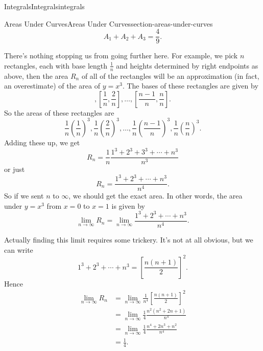 \documentclass[oneside,10pt,]{book}
\numberwithin{equation}{section}
\begin{document}
\begin{chapterptx}{Integrals}{}{Integrals}{}{}{integrals}
\begin{sectionptx}{Areas Under Curves}{}{Areas Under Curves}{}{}{section-areas-under-curves}
\begin{equation*}
A_{1} + A_{2} + A_{3} = \frac{4}{9}.
\end{equation*}
%
\par
\hypertarget{p-405}{}%
There's nothing stopping us from going further here. For example, we pick \(n\) rectangles, each with base length \(\frac{1}{n}\) and heights determined by right endpoints as above, then the area \(R_{n}\) of all of the rectangles will be an approximation (in fact, an overestimate) of the area of \(y = x^{3}\). The bases of these rectangles are given by%
\begin{equation*}
[0,\frac{1}{n}], [\frac{1}{n},\frac{2}{n}],\ldots,[\frac{n-1}{n},\frac{n}{n}].
\end{equation*}
So the areas of these rectangles are%
\begin{equation*}
\frac{1}{n}\left(\frac{1}{n}\right)^{3}, \frac{1}{n}\left(\frac{2}{n}\right)^{3},\ldots,\frac{1}{n}\left(\frac{n-1}{n}\right)^{3}, \frac{1}{n}\left(\frac{n}{n}\right)^{3}.
\end{equation*}
Adding these up, we get%
\begin{equation*}
R_{n} = \frac{1}{n}\frac{1^{3}+2^{3} + 3^{3} + \cdots + n^{3}}{n^{3}}
\end{equation*}
or just%
\begin{equation*}
R_{n} = \frac{1^{3} + 2^{3} + \cdots + n^{3}}{n^{4}}.
\end{equation*}
So if we sent \(n\) to \(\infty\), we should get the exact area. In other words, the area under \(y=x^{3}\) from \(x=0\) to \(x=1\) is given by%
\begin{equation*}
\lim_{n\to\infty}R_{n} = \lim_{n\to\infty}\frac{1^{3} + 2^{3} + \cdots + n^{3}}{n^{4}}.
\end{equation*}
%
\par
\hypertarget{p-406}{}%
Actually finding this limit requires some trickery. It's not at all obvious, but we can write%
\begin{equation*}
1^{3} + 2^{3} + \cdots + n^{3} = \left[\frac{n(n+1)}{2}\right]^{2}.
\end{equation*}
Hence%
\begin{align*}
\lim_{n\to\infty}R_{n} & = \lim_{n\to\infty}\frac{1}{n^{4}}\left[\frac{n(n+1)}{2}\right]^{2} \\
& = \lim_{n\to\infty}\frac{1}{4}\frac{n^{2}(n^{2}+2n+1)}{n^{4}} \\
& = \lim_{n\to\infty}\frac{1}{4}\frac{n^{4} + 2n^{3} + n^{2}}{n^{4}} \\
& = \frac{1}{4}. 

\end{align*}
\end{sectionptx}
\end{chapterptx}
\end{document}
